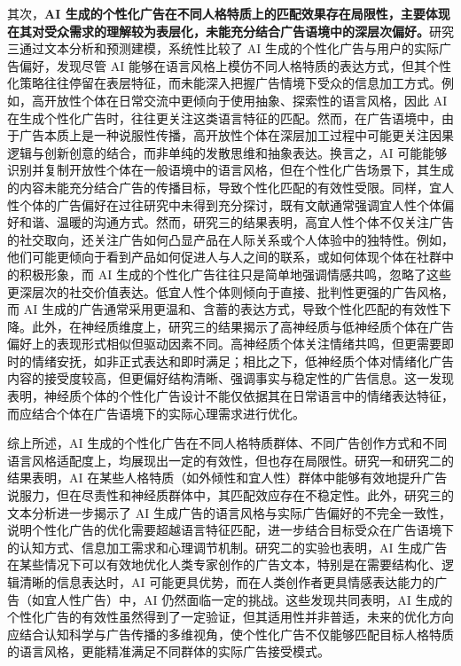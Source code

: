 其次，\textbf{AI 生成的个性化广告在不同人格特质上的匹配效果存在局限性，主要体现在其对受众需求的理解较为表层化，未能充分结合广告语境中的深层次偏好。}研究三通过文本分析和预测建模，系统性比较了 AI 生成的个性化广告与用户的实际广告偏好，发现尽管 AI 能够在语言风格上模仿不同人格特质的表达方式，但其个性化策略往往停留在表层特征，而未能深入把握广告情境下受众的信息加工方式。例如，高开放性个体在日常交流中更倾向于使用抽象、探索性的语言风格，因此 AI 在生成个性化广告时，往往更关注这类语言特征的匹配。然而，在广告语境中，由于广告本质上是一种说服性传播，高开放性个体在深层加工过程中可能更关注因果逻辑与创新创意的结合，而非单纯的发散思维和抽象表达。换言之，AI 可能能够识别并复制开放性个体在一般语境中的语言风格，但在个性化广告场景下，其生成的内容未能充分结合广告的传播目标，导致个性化匹配的有效性受限。同样，宜人性个体的广告偏好在过往研究中未得到充分探讨，既有文献通常强调宜人性个体偏好和谐、温暖的沟通方式。然而，研究三的结果表明，高宜人性个体不仅关注广告的社交取向，还关注广告如何凸显产品在人际关系或个人体验中的独特性。例如，他们可能更倾向于看到产品如何促进人与人之间的联系，或如何体现个体在社群中的积极形象，而 AI 生成的个性化广告往往只是简单地强调情感共鸣，忽略了这些更深层次的社交价值表达。低宜人性个体则倾向于直接、批判性更强的广告风格，而 AI 生成的广告通常采用更温和、含蓄的表达方式，导致个性化匹配的有效性下降。此外，在神经质维度上，研究三的结果揭示了高神经质与低神经质个体在广告偏好上的表现形式相似但驱动因素不同。高神经质个体关注情绪共鸣，但更需要即时的情绪安抚，如非正式表达和即时满足；相比之下，低神经质个体对情绪化广告内容的接受度较高，但更偏好结构清晰、强调事实与稳定性的广告信息。这一发现表明，神经质个体的个性化广告设计不能仅依据其在日常语言中的情绪表达特征，而应结合个体在广告语境下的实际心理需求进行优化。

综上所述，AI 生成的个性化广告在不同人格特质群体、不同广告创作方式和不同语言风格适配度上，均展现出一定的有效性，但也存在局限性。研究一和研究二的结果表明，AI 在某些人格特质（如外倾性和宜人性）群体中能够有效地提升广告说服力，但在尽责性和神经质群体中，其匹配效应存在不稳定性。此外，研究三的文本分析进一步揭示了 AI 生成广告的语言风格与实际广告偏好的不完全一致性，说明个性化广告的优化需要超越语言特征匹配，进一步结合目标受众在广告语境下的认知方式、信息加工需求和心理调节机制。研究二的实验也表明，AI 生成广告在某些情况下可以有效地优化人类专家创作的广告文本，特别是在需要结构化、逻辑清晰的信息表达时，AI 可能更具优势，而在人类创作者更具情感表达能力的广告（如宜人性广告）中，AI 仍然面临一定的挑战。这些发现共同表明，AI 生成的个性化广告的有效性虽然得到了一定验证，但其适用性并非普适，未来的优化方向应结合认知科学与广告传播的多维视角，使个性化广告不仅能够匹配目标人格特质的语言风格，更能精准满足不同群体的实际广告接受模式。

